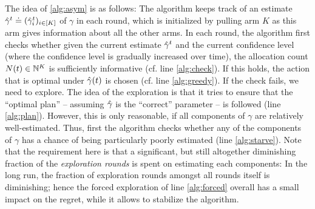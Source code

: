 The idea of \cref{alg:asym} is as follows:
The algorithm keeps track of an estimate $\hat{\gamma}^{t}\doteq(\hat{\gamma}^t_i)_{i \in [K]}$ of $\gamma$ in each round, which is initialized by pulling arm $K$ as this arm
gives information about all the other arms.
In each round, the algorithm first checks whether given the current estimate $\hat{\gamma}^t$ and the current confidence level (where the confidence level is gradually increased over time), the  allocation count $N(t)\in \mathbb{N}^K$
is sufficiently informative (cf. line \ref{alg:check}). If this holds, the action that is optimal under $\hat{\gamma}(t)$ is chosen 
(cf. line \ref{alg:greedy}). If the check fails, we need to explore.
The idea of the exploration is that it tries to ensure that the ``optimal plan'' -- assuming $\hat{\gamma}$ is the ``correct'' parameter -- is followed (line \ref{alg:plan}). However, this is only reasonable, if all components of $\gamma$ are relatively well-estimated.
Thus, first the algorithm checks whether any of the components of $\gamma$ has a chance of being
particularly poorly estimated (line \ref{alg:starve}). Note that the requirement here is that a significant, but still altogether diminishing fraction of the \emph{exploration rounds} is spent on estimating each components: In the long run, the fraction of exploration rounds amongst all rounds itself is diminishing; hence the forced exploration of line \ref{alg:forced} overall has a small impact on the regret, while it allows to stabilize the algorithm.

